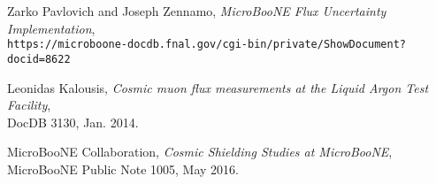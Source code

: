 \begin{thebibliography}{20}

  Zarko Pavlovich and Joseph Zennamo, \emph{MicroBooNE Flux Uncertainty Implementation},\\
  \texttt{https://microboone-docdb.fnal.gov/cgi-bin/private/ShowDocument?docid=8622}

Leonidas Kalousis, \emph{Cosmic muon flux measurements at the Liquid Argon Test Facility}, \\DocDB 3130, Jan. 2014. 

MicroBooNE Collaboration, \emph{Cosmic Shielding Studies at MicroBooNE}, \\ MicroBooNE Public Note 1005, May 2016.


\end{thebibliography}
